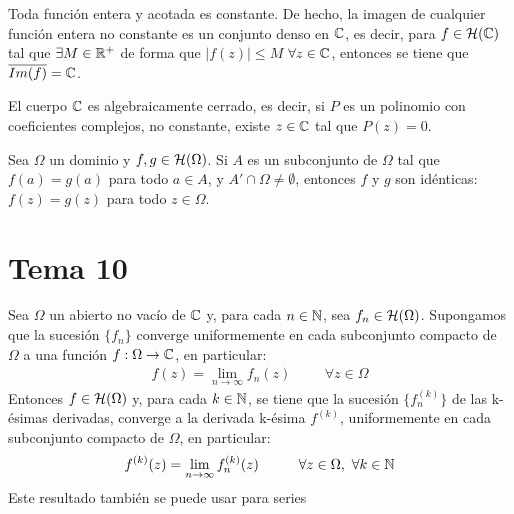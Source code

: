 \documentclass[12pt]{article}
\begin{document}
    \begin{teo} Toda función entera y acotada es constante. De hecho, la imagen de cualquier función entera no constante es un conjunto denso en $\mathbb{C}$, es decir, para $f\in \mathcal{H}(\mathbb{C})$ tal que $\exists M\in \mathbb{R}^+$ de forma que $|f(z)| \leq M$ $\forall z \in \mathbb{C}$, entonces se tiene que $\overline{Im(f)} = \mathbb{C}$.
    \end{teo}

    \begin{teo} El cuerpo $\mathbb{C}$ es algebraicamente cerrado, es decir, si $P$ es un polinomio con coeficientes complejos, no constante, existe $z\in \mathbb{C}$ tal que $P(z) = 0$.
    \end{teo}

    \begin{prop} Sea $\Omega$ un dominio y $f,g\in \mathcal{H}(\Omega)$. Si $A$ es un subconjunto de $\Omega$ tal que $f(a) = g(a)$ para todo $a\in A$, y $A' \cap \Omega \neq \emptyset$, entonces $f$ y $g$ son idénticas: $f(z)=g(z)$ para todo $z\in \Omega$.
    \end{prop}

    \newpage

    \section{Tema 10}

    \begin{teo} Sea $\Omega$ un abierto no vacío de $\mathbb{C}$ y, para cada $n\in \mathbb{N}$, sea $f_n \in \mathcal{H}(\Omega)$. Supongamos que la sucesión $\{f_n\}$ converge uniformemente en cada subconjunto compacto de $\Omega$ a una función $f:\Omega \to \mathbb{C}$, en particular:
    \begin{gather*}
        f(z) = \lim_{n\to \infty} f_n(z) \hspace{1cm} \forall z \in \Omega
    \end{gather*}
    Entonces $f\in \mathcal{H}(\Omega)$ y, para cada $k\in \mathbb{N}$, se tiene que la sucesión $\{f^{(k)}_n\}$ de las k-ésimas derivadas, converge a la derivada k-ésima $f^{(k)}$, uniformemente en cada subconjunto compacto de $\Omega$, en particular:
    \begin{gather*}
        f^{(k)} (z) = \lim_{n\to \infty} f_n^{(k)} (z) \hspace{1cm} \forall z \in \Omega,\ \forall k \in \mathbb{N}
    \end{gather*}
    Este resultado también se puede usar para series
    \end{teo}
\end{document}
